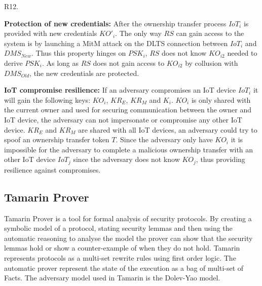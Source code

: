 {\begin{labeling}{R12.}
\item [R11.] \textbf{Protection of new credentials:} 
After the ownership transfer process $IoT_i$ is provided with new credentials $KO'_i$. The only way $RS$ can gain access to the system is by launching a MitM attack on the DLTS connection between $IoT_i$ and $DMS_{New}$. Thus this property hinges on $PSK_i$, $RS$ does not know $KO_{i2}$ needed to derive $PSK_i$. As long as $RS$ does not gain access to $KO_{i2}$ by collusion with $DMS_{Old}$, the new credentials are protected.
\item [R12.] \textbf{IoT compromise resilience:} 
If an adversary compromises an IoT device $IoT_i$ it will gain the following keys: $KO_i$, $KR_E$, $KR_M$ and $K_i$. $KO_i$ is only shared with the current owner and used for securing communication between the owner and IoT device, the adversary can not impersonate or compromise any other IoT device. $KR_E$ and $KR_M$ are shared with all IoT devices, an adversary could try to spoof an ownership transfer token $T$. Since the adversary only have $KO_i$ it is impossible for the adversary to complete a malicious ownership transfer with an other IoT device $IoT_j$ since the adversary does not know $KO_j$, thus providing resilience against compromises.
\end{labeling}

\subsection{Tamarin Prover}
\label{Tamarin}
Tamarin Prover is a tool for formal analysis of security protocols. By creating a symbolic model of a protocol, stating security lemmas and then using the automatic reasoning to analyse the model the prover can  show that the security lemmas hold or show a counter-example of when they do not hold.
Tamarin represents protocols as a multi-set rewrite rules using first order logic. The automatic prover represent the state of the execution as a bag of multi-set of Facts. The adversary model used in Tamarin is the Dolev-Yao model. %

}
